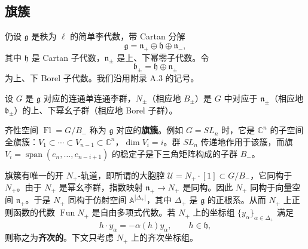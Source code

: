 \subsection{旗簇}

仍设 $\mathfrak{g}$ 是秩为 $\ell$ 的简单李代数，带 Cartan 分解
\begin{equation}
    \mathfrak{g}=\mathfrak{n}_+\oplus\mathfrak{h}\oplus\mathfrak{n}_- ,
    \tag{5.2-1}
\end{equation}
其中 $\mathfrak{h}$ 是 Cartan 子代数，$\mathfrak{n}_\pm$ 是上、下幂零子代数。令
\[
    \mathfrak{b}_\pm=\mathfrak{h}\oplus\mathfrak{n}_\pm
\]
为上、下 Borel 子代数。我们沿用附录 A.3 的记号。


设 $G$ 是 $\mathfrak{g}$ 对应的连通单连通李群，$N_\pm$（相应地 $B_\pm$）是 $G$ 中对应于 $\mathfrak{n}_\pm$（相应地 $\mathfrak{b}_\pm$）的上、下幂幺子群（相应地 Borel 子群）。

齐性空间 $\operatorname{Fl}=G/B_-$ 称为 $\mathfrak{g}$ 对应的\textbf{旗簇}。例如 $G=SL_n$ 时，它是 $\mathbb{C}^n$ 的子空间全旗簇：$V_1\subset\cdots\subset V_{n-1}\subset\mathbb{C}^n$，$\dim V_i=i$。群 $SL_n$ 传递地作用于该簇，而旗 $V_i=\operatorname{span}(e_n,\ldots,e_{n-i+1})$ 的稳定子是下三角矩阵构成的子群 $B_-$。

旗簇有唯一的开 $N_+$-轨道，即所谓的大胞腔 $\mathcal{U}=N_+\cdot[1]\subset G/B_-$，它同构于 $N_+$。由于 $N_+$ 是幂幺李群，指数映射 $\mathfrak{n}_+\to N_+$ 是同构。因此 $N_+$ 同构于向量空间 $\mathfrak{n}_+$。于是 $N_+$ 同构于仿射空间 $\mathbb{A}^{|\Delta_+|}$，其中 $\Delta_+$ 是 $\mathfrak{g}$ 的正根系。从而 $N_+$ 上正则函数的代数 $\operatorname{Fun}N_+$ 是自由多项式代数。若 $N_+$ 上的坐标组 $\{y_\alpha\}_{\alpha\in\Delta_+}$ 满足
\[
    h\cdot y_\alpha=-\alpha(h)y_\alpha,\qquad h\in\mathfrak{h},
\]
则称之为\textbf{齐次的}。下文只考虑 $N_+$ 上的齐次坐标组。

